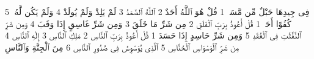 {\tiny\colorbox{cl_aya}{5}} فِى جِيدِهَا حَبْلٌ مِّن مَّسَدٍۭ
{\tiny\colorbox{cl_aya}{1}} قُلْ هُوَ ٱللَّهُ أَحَدٌ
{\tiny\colorbox{cl_aya}{2}} ٱللَّهُ ٱلصَّمَدُ
{\tiny\colorbox{cl_aya}{3}} لَمْ يَلِدْ وَلَمْ يُولَدْ
{\tiny\colorbox{cl_aya}{4}} وَلَمْ يَكُن لَّهُۥ كُفُوًا أَحَدٌۢ
{\tiny\colorbox{cl_aya}{1}} قُلْ أَعُوذُ بِرَبِّ ٱلْفَلَقِ
{\tiny\colorbox{cl_aya}{2}} مِن شَرِّ مَا خَلَقَ
{\tiny\colorbox{cl_aya}{3}} وَمِن شَرِّ غَاسِقٍ إِذَا وَقَبَ
{\tiny\colorbox{cl_aya}{4}} وَمِن شَرِّ ٱلنَّفَّٰثَٰتِ فِى ٱلْعُقَدِ
{\tiny\colorbox{cl_aya}{5}} وَمِن شَرِّ حَاسِدٍ إِذَا حَسَدَ
{\tiny\colorbox{cl_aya}{1}} قُلْ أَعُوذُ بِرَبِّ ٱلنَّاسِ
{\tiny\colorbox{cl_aya}{2}} مَلِكِ ٱلنَّاسِ
{\tiny\colorbox{cl_aya}{3}} إِلَٰهِ ٱلنَّاسِ
{\tiny\colorbox{cl_aya}{4}} مِن شَرِّ ٱلْوَسْوَاسِ ٱلْخَنَّاسِ
{\tiny\colorbox{cl_aya}{5}} ٱلَّذِى يُوَسْوِسُ فِى صُدُورِ ٱلنَّاسِ
{\tiny\colorbox{cl_aya}{6}} مِنَ ٱلْجِنَّةِ وَٱلنَّاسِ
